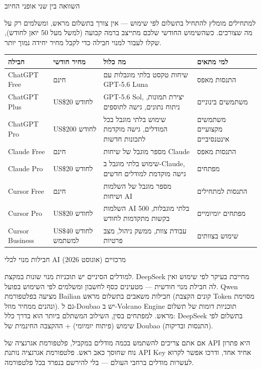 \begin{center}\small\color{gray}השוואה בין שני אופני החיוב\end{center}

למתחילים מומלץ להתחיל בתשלום לפי שימוש — אין צורך בתשלום מראש, ומשלמים רק על מה שצורכים. כשהשימוש החודשי שלכם מתייצב ברמה קבועה (למשל מעל 50 יואן לחודש), שקלו לעבור למנוי חבילה כדי לקבל מחיר יחידה נמוך יותר.


\begin{center}
\begin{tabularx}{\linewidth}{|X|X|X|X|}
\hline
\textbf{חבילה} & \textbf{מחיר חודשי} & \textbf{מה כלול} & \textbf{למי מתאים} \tabularnewline
\hline
ChatGPT Free & חינם & שיחות טקסט בלתי מוגבלות עם GPT-5.6 Luna & התנסות מאפס \tabularnewline
ChatGPT Plus & US\$20 לחודש & GPT-5.6 Sol, יצירת תמונות, ניתוח נתונים, גישה לתוספים & משתמשים בינוניים \tabularnewline
ChatGPT Pro & US\$200 לחודש & שימוש בלתי מוגבל בכל המודלים, גישה מוקדמת לתכונות חדשות & משתמשים מקצועיים אינטנסיביים \tabularnewline
Claude Free & חינם & מספר מוגבל של שיחות Claude & התנסות מאפס \tabularnewline
Claude Pro & US\$20 לחודש & שימוש בלתי מוגבל ב-Claude, גישה מוקדמת למודלים חדשים & מפתחים \tabularnewline
Cursor Free & חינם & מספר מוגבל של השלמות ושיחות AI & התנסות למתחילים \tabularnewline
Cursor Pro & US\$20 לחודש & השלמות AI בלתי מוגבלות, 500 בקשות מתקדמות לחודש & מפתחים יומיומיים \tabularnewline
Cursor Business & US\$40 לחודש למשתמש & עבודת צוות, ממשק ניהול, מצב פרטיות & שימוש בצוותים \tabularnewline
\hline
\end{tabularx}
\end{center}

\begin{center}\small\color{gray}חבילות מנוי לכלי AI מרכזיים (אוגוסט 2026)\end{center}

למודלים הסיניים יש תוכניות מנוי שונות במקצת. DeepSeek מחייבת בעיקר לפי שימוש ואין לה חבילת מנוי חודשית — מטעינים כסף לחשבון ומשלמים לפי השימוש בפועל. Qwen מציעה בפלטפורמת Bailian חבילות משאבים בתשלום מראש (קונים הקצבת Token מסוימת ונהנים ממחיר מוזל). גם ל-Doubao יש ב-Volcano Engine תוכניות דומות של תשלום מראש. למפתחים בסין, השילוב המשתלם ביותר הוא בדרך כלל: DeepSeek בתשלום לפי שימוש (פיתוח יומיומי) + ההקצבה החינמית של Doubao (התנסות ובדיקות).


אם אתם צריכים להשתמש בכמה מודלים במקביל, פלטפורמת אגרגציה של API היא פתרון נוח שחוסך כאב ראש. פלטפורמת אגרגציה נותנת API Key אחיד אחד, ודרכו אפשר לקרוא לעשרות מודלים ברחבי העולם — בלי להירשם בנפרד בכל פלטפורמה.

